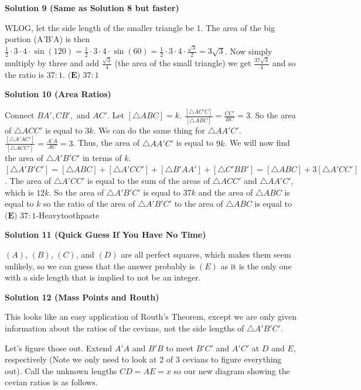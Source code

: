\begin{enumerate}
\textbf{Solution 9 (Same as Solution 8 but faster)}

WLOG, let the side length of the smaller triangle be 1. The area of the big portion (A'B'A) is then $\frac{1}{2}\cdot3\cdot4\cdot\sin\left(120\right)=\frac{1}{2}\cdot3\cdot4\cdot\sin\left(60\right)=\frac{1}{2}\cdot3\cdot4\cdot\frac{\sqrt{3}}{2}=3\sqrt{3}$. Now simply multiply by three and add $\frac{\sqrt{3}}{4}$ (the area of the small triangle) we get $\frac{37\sqrt{3}}{4}$ and so the ratio is $37:1$. $\boxed{\textbf{(E) }37:1}$




\textbf{Solution 10 (Area Ratios)}

Connect $BA', CB',$ and $AC'$. Let $[\triangle ABC]=k$. $\frac{[\triangle AC'C]}{[\triangle ABC]}=\frac{CC'}{BC}=3$. So the area of $\triangle ACC'$ is equal to $3k$. We can do the same thing for $\triangle AA'C'$. $\frac{[\triangle A'AC']}{[\triangle ACC']}=\frac{A'A}{AC}=3$. Thus, the area of $\triangle AA'C'$ is equal to $9k$. We will now find the area of $\triangle A'B'C'$ in terms of $k$. $[\triangle A'B'C']=[\triangle ABC]+[\triangle A'CC']+[\triangle B'AA']+[\triangle C'BB']=[\triangle ABC]+3[\triangle A'CC']$. The area of $\triangle A'CC'$ is equal to the sum of the areas of $\triangle ACC'$ and $\triangle AA'C'$, which is $12k$. So the area of $\triangle A'B'C'$ is equal to $37k$ and the area of $\triangle ABC$ is equal to $k$ so the ratio of the area of $\triangle A'B'C'$ to the area of $\triangle ABC$ is equal to $\boxed{\textbf{(E) } 37:1}$-Heavytoothpaste

 


 



\textbf{Solution 11 (Quick Guess If You Have No Time)}

$(A)$, $(B)$, $(C)$, and $(D)$ are all perfect squares, which makes them seem unlikely, so we can guess that the answer probably is $\boxed{(E)}$ as it is the only one with a side length that is implied to not be an integer.

 



\textbf{Solution 12 (Mass Points and Routh)}

This looks like an easy application of Routh's Theorem, except we are only given information about the ratios of the cevians, not the side lengths of $\triangle A'B'C'$. 

 Let's figure those out.  Extend $A'A$ and $B'B$ to meet $B'C'$ and $A'C'$ at $D$ and $E$, respectively (Note we only need to look at 2 of 3 cevians to figure everything out).  Call the unknown lengths $CD=AE=x$ so our new diagram showing the cevian ratios is as follows.


\end{enumerate}
